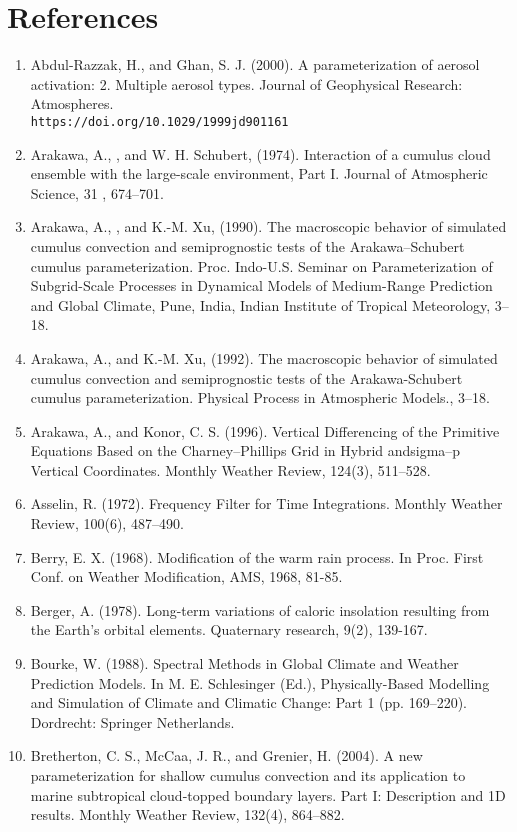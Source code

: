 \section{References}
\begin{enumerate}
\setlength{\parskip}{0pt} %
\setlength{\itemsep}{5pt} %
\setlength{\leftskip}{0pt} %
\item Abdul-Razzak, H., and Ghan, S. J. (2000). A parameterization of aerosol activation: 2. Multiple aerosol types. Journal of Geophysical Research: Atmospheres. \\
\texttt{https://doi.org/10.1029/1999jd901161}
\item Arakawa, A., , and W. H. Schubert, (1974). Interaction of a cumulus cloud ensemble with the large-scale environment, Part I. Journal of Atmospheric Science, 31 , 674–701.
\item Arakawa, A., , and K.-M. Xu, (1990). The macroscopic behavior of simulated cumulus convection and semiprognostic tests of the Arakawa–Schubert cumulus parameterization. Proc. Indo-U.S. Seminar on Parameterization of Subgrid-Scale Processes in Dynamical Models of Medium-Range Prediction and Global Climate, Pune, India, Indian Institute of Tropical Meteorology, 3–18.
\item Arakawa, A., and K.-M. Xu, (1992). The macroscopic behavior of simulated cumulus convection and semiprognostic tests of the Arakawa-Schubert cumulus parameterization. Physical Process in Atmospheric Models., 3–18.
\item Arakawa, A., and Konor, C. S. (1996). Vertical Differencing of the Primitive Equations Based on the Charney–Phillips Grid in Hybrid andsigma–p Vertical Coordinates. Monthly Weather Review, 124(3), 511–528.
\item Asselin, R. (1972). Frequency Filter for Time Integrations. Monthly Weather Review, 100(6), 487–490.
\item Berry, E. X. (1968). Modification of the warm rain process. In Proc. First Conf. on Weather Modification, AMS, 1968, 81-85.
\item Berger, A. (1978). Long-term variations of caloric insolation resulting from the Earth's orbital elements. Quaternary research, 9(2), 139-167.
\item Bourke, W. (1988). Spectral Methods in Global Climate and Weather Prediction Models. In M. E. Schlesinger (Ed.), Physically-Based Modelling and Simulation of Climate and Climatic Change: Part 1 (pp. 169–220). Dordrecht: Springer Netherlands.
\item Bretherton, C. S., McCaa, J. R., and Grenier, H. (2004). A new parameterization for shallow cumulus convection and its application to marine subtropical cloud-topped boundary layers. Part I: Description and 1D results. Monthly Weather Review, 132(4), 864–882.

\end{enumerate}
